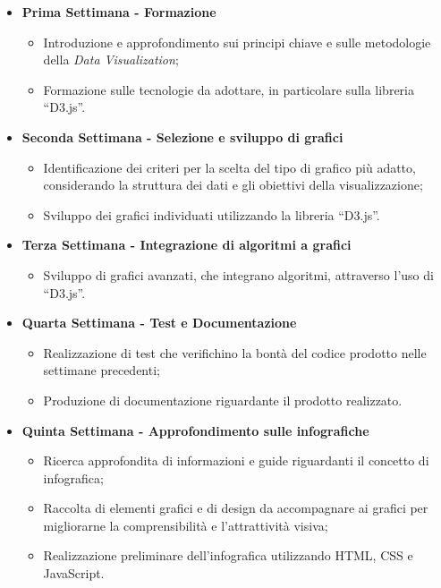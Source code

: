 \begin{itemize}
    \item \textbf{Prima Settimana - Formazione}
    \begin{itemize}
        \item Introduzione e approfondimento sui principi chiave e sulle metodologie della \textit{Data Visualization};
        \item Formazione sulle tecnologie da adottare, in particolare sulla libreria ``D3.js''.
    \end{itemize}
    \item \textbf{Seconda Settimana - Selezione e sviluppo di grafici} 
    \begin{itemize}
        \item Identificazione dei criteri per la scelta del tipo di grafico più adatto, considerando la struttura dei dati e gli obiettivi della visualizzazione;
        \item Sviluppo dei grafici individuati utilizzando la libreria ``D3.js''.
    \end{itemize}
    \item \textbf{Terza Settimana - Integrazione di algoritmi a grafici} 
    \begin{itemize}
        \item Sviluppo di grafici avanzati, che integrano algoritmi, attraverso l'uso di ``D3.js''.
    \end{itemize}
    \item \textbf{Quarta Settimana - Test e Documentazione} 
    \begin{itemize}
        \item Realizzazione di test che verifichino la bontà del codice prodotto nelle settimane precedenti;
        \item Produzione di documentazione riguardante il prodotto realizzato.
    \end{itemize}
    \item \textbf{Quinta Settimana - Approfondimento sulle infografiche} 
    \begin{itemize}
        \item Ricerca approfondita di informazioni e guide riguardanti il concetto di infografica;
        \item Raccolta di elementi grafici e di design da accompagnare ai grafici per migliorarne la comprensibilità e l'attrattività visiva;
        \item Realizzazione preliminare dell'infografica utilizzando HTML, CSS e JavaScript.
    \end{itemize}

\end{itemize}
